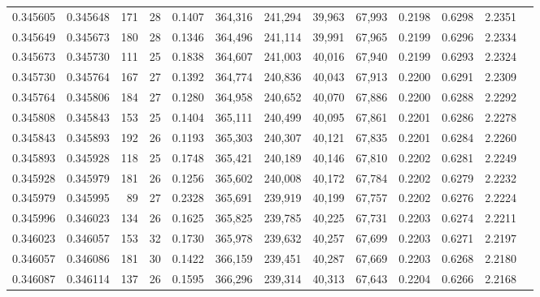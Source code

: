 \begin{tabular}{rrrrrrrrrrrrr}
0.345605 & 0.345648 &   171 &  28 &                                     0.1407 & 364,316 & 241,294 &  39,963 &  67,993 & 0.2198 & 0.6298 & 2.2351 \\
0.345649 & 0.345673 &   180 &  28 &                                     0.1346 & 364,496 & 241,114 &  39,991 &  67,965 & 0.2199 & 0.6296 & 2.2334 \\
0.345673 & 0.345730 &   111 &  25 &                                     0.1838 & 364,607 & 241,003 &  40,016 &  67,940 & 0.2199 & 0.6293 & 2.2324 \\
0.345730 & 0.345764 &   167 &  27 &                                     0.1392 & 364,774 & 240,836 &  40,043 &  67,913 & 0.2200 & 0.6291 & 2.2309 \\
0.345764 & 0.345806 &   184 &  27 &                                     0.1280 & 364,958 & 240,652 &  40,070 &  67,886 & 0.2200 & 0.6288 & 2.2292 \\
0.345808 & 0.345843 &   153 &  25 &                                     0.1404 & 365,111 & 240,499 &  40,095 &  67,861 & 0.2201 & 0.6286 & 2.2278 \\
0.345843 & 0.345893 &   192 &  26 &                                     0.1193 & 365,303 & 240,307 &  40,121 &  67,835 & 0.2201 & 0.6284 & 2.2260 \\
0.345893 & 0.345928 &   118 &  25 &                                     0.1748 & 365,421 & 240,189 &  40,146 &  67,810 & 0.2202 & 0.6281 & 2.2249 \\
0.345928 & 0.345979 &   181 &  26 &                                     0.1256 & 365,602 & 240,008 &  40,172 &  67,784 & 0.2202 & 0.6279 & 2.2232 \\
0.345979 & 0.345995 &    89 &  27 &                                     0.2328 & 365,691 & 239,919 &  40,199 &  67,757 & 0.2202 & 0.6276 & 2.2224 \\
0.345996 & 0.346023 &   134 &  26 &                                     0.1625 & 365,825 & 239,785 &  40,225 &  67,731 & 0.2203 & 0.6274 & 2.2211 \\
0.346023 & 0.346057 &   153 &  32 &                                     0.1730 & 365,978 & 239,632 &  40,257 &  67,699 & 0.2203 & 0.6271 & 2.2197 \\
0.346057 & 0.346086 &   181 &  30 &                                     0.1422 & 366,159 & 239,451 &  40,287 &  67,669 & 0.2203 & 0.6268 & 2.2180 \\
0.346087 & 0.346114 &   137 &  26 &                                     0.1595 & 366,296 & 239,314 &  40,313 &  67,643 & 0.2204 & 0.6266 & 2.2168 \\

\end{tabular}
